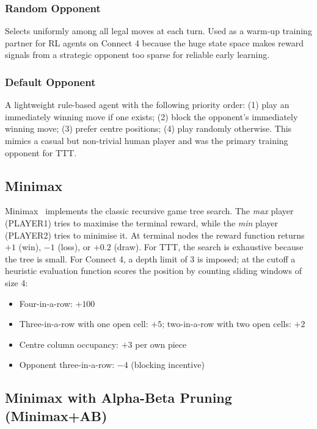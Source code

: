 \documentclass[11pt,a4paper]{article}
\begin{document}
\subsubsection{Random Opponent}
Selects uniformly among all legal moves at each turn. Used as a warm-up training partner for RL agents
on Connect 4 because the huge state space makes reward signals from a strategic opponent too sparse
for reliable early learning.

\subsubsection{Default Opponent}
A lightweight rule-based agent with the following priority order: (1) play an immediately winning move
if one exists; (2) block the opponent's immediately winning move; (3) prefer centre positions; (4) play
randomly otherwise. This mimics a casual but non-trivial human player and was the primary training
opponent for TTT.

\subsection{Minimax}

Minimax~\cite{russell2020} implements the classic recursive game tree search. The \emph{max} player
(PLAYER1) tries to maximise the terminal reward, while the \emph{min} player (PLAYER2) tries to
minimise it. At terminal nodes the reward function returns $+1$ (win), $-1$ (loss), or $+0.2$ (draw).
For TTT, the search is exhaustive because the tree is small. For Connect 4, a depth limit of 3 is
imposed; at the cutoff a heuristic evaluation function scores the position by counting sliding windows
of size 4:

\begin{itemize}[noitemsep]
    \item Four-in-a-row: $+100$
    \item Three-in-a-row with one open cell: $+5$; two-in-a-row with two open cells: $+2$
    \item Centre column occupancy: $+3$ per own piece
    \item Opponent three-in-a-row: $-4$ (blocking incentive)
\end{itemize}

\subsection{Minimax with Alpha-Beta Pruning (Minimax+AB)}
\end{document}
